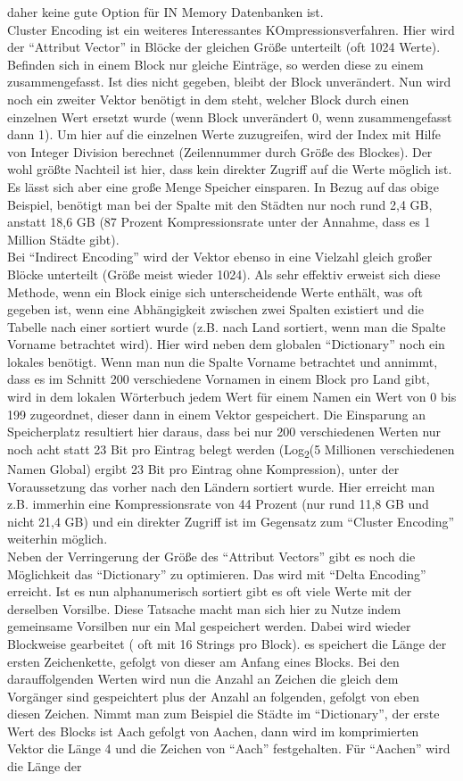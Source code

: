 \documentclass[a4paper, 12pt]{scrartcl}
\begin{document}
daher keine gute Option für IN Memory Datenbanken ist.\\ Cluster Encoding ist ein weiteres Interessantes KOmpressionsverfahren. Hier wird der "`Attribut Vector"' in Blöcke der gleichen Größe unterteilt (oft 1024 Werte). Befinden sich in einem Block nur gleiche Einträge, so werden diese zu einem zusammengefasst. Ist dies nicht gegeben, bleibt der Block unverändert. Nun wird noch ein zweiter Vektor benötigt in dem steht, welcher Block durch einen einzelnen Wert ersetzt wurde (wenn Block unverändert 0, wenn zusammengefasst dann 1). Um hier auf die  einzelnen Werte zuzugreifen, wird der Index mit Hilfe von Integer Division berechnet (Zeilennummer durch Größe des Blockes). Der wohl größte Nachteil ist hier, dass kein direkter Zugriff auf die Werte möglich ist. Es lässt sich aber eine große Menge Speicher einsparen. In Bezug auf das obige Beispiel, benötigt man bei der Spalte mit den Städten nur noch rund 2,4 GB, anstatt 18,6 GB (87 Prozent Kompressionsrate unter der Annahme, dass es 1 Million Städte gibt).\\ Bei "`Indirect Encoding"' wird der Vektor ebenso in eine Vielzahl gleich großer Blöcke unterteilt (Größe meist wieder 1024). Als sehr effektiv erweist sich diese Methode, wenn ein Block einige sich unterscheidende Werte enthält, was oft gegeben ist, wenn eine Abhängigkeit zwischen zwei Spalten existiert und die Tabelle nach einer sortiert wurde (z.B. nach Land sortiert, wenn man die Spalte Vorname betrachtet wird). Hier wird neben dem globalen "`Dictionary"' noch ein lokales benötigt. Wenn man nun die Spalte Vorname betrachtet und annimmt, dass es im Schnitt 200 verschiedene Vornamen in einem Block pro Land gibt, wird in dem lokalen Wörterbuch jedem Wert für einem Namen ein Wert von 0 bis 199 zugeordnet, dieser dann in einem Vektor gespeichert. Die Einsparung an Speicherplatz resultiert hier daraus, dass bei nur 200 verschiedenen Werten nur noch acht statt 23 Bit pro Eintrag belegt werden (Log\textsubscript{2}(5 Millionen verschiedenen Namen Global) ergibt 23 Bit pro Eintrag ohne Kompression), unter der Voraussetzung das vorher nach den Ländern sortiert wurde. Hier erreicht man z.B. immerhin eine Kompressionsrate von 44 Prozent (nur rund 11,8 GB und nicht 21,4 GB) und ein direkter Zugriff ist im Gegensatz zum "`Cluster Encoding"' weiterhin möglich.\\ Neben der Verringerung der Größe des "`Attribut Vectors"' gibt es noch die Möglichkeit das "`Dictionary"' zu optimieren. Das wird mit "`Delta Encoding"' erreicht. Ist es nun alphanumerisch sortiert gibt es oft viele Werte mit der derselben Vorsilbe. Diese Tatsache macht man sich hier zu Nutze indem gemeinsame Vorsilben nur ein Mal gespeichert werden. Dabei wird wieder Blockweise gearbeitet ( oft mit 16 Strings pro Block). es speichert die Länge der ersten Zeichenkette, gefolgt von dieser am Anfang eines Blocks. Bei den darauffolgenden Werten wird nun die Anzahl an Zeichen die gleich dem Vorgänger sind gespeichtert plus der Anzahl an folgenden, gefolgt von eben diesen Zeichen. Nimmt man zum Beispiel die Städte im "`Dictionary"', der erste Wert des Blocks ist Aach gefolgt von Aachen, dann wird im komprimierten Vektor die Länge 4 und die Zeichen von "`Aach"' festgehalten. Für "`Aachen"' wird die Länge der 
\end{document}
